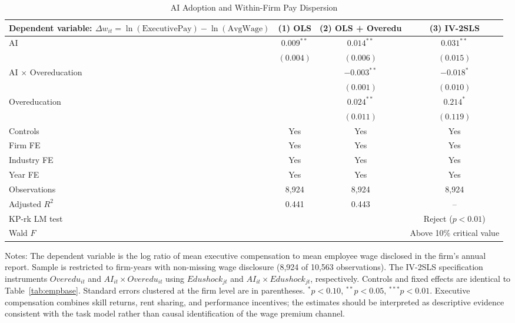 \documentclass[12pt,a4paper]{article}
\theoremstyle{predstyle}
\theoremstyle{plain}
\newcommand{\Overedu}{\mathit{Overedu}}
\begin{document}
\begin{table}[H]
\centering
\caption{AI Adoption and Within-Firm Pay Dispersion}
\label{tab:wageprem}
\begin{threeparttable}
\scriptsize
\setlength{\tabcolsep}{4pt}
\begin{tabular}{lccc}
\toprule
Dependent variable: \(\Delta w_{it} = \ln(\text{ExecutivePay}) - \ln(\text{AvgWage})\) & (1) OLS & (2) OLS + Overedu & (3) IV-2SLS \\
\midrule
AI & \(0.009^{**}\) & \(0.014^{**}\) & \(0.031^{**}\) \\
 & \((0.004)\) & \((0.006)\) & \((0.015)\) \\
AI \(\times\) Overeducation & & \(-0.003^{**}\) & \(-0.018^{*}\) \\
 & & \((0.001)\) & \((0.010)\) \\
Overeducation & & \(0.024^{**}\) & \(0.214^{*}\) \\
 & & \((0.011)\) & \((0.119)\) \\
Controls & Yes & Yes & Yes \\
Firm FE & Yes & Yes & Yes \\
Industry FE & Yes & Yes & Yes \\
Year FE & Yes & Yes & Yes \\
\midrule
Observations & 8,924 & 8,924 & 8,924 \\
Adjusted \(R^2\) & 0.441 & 0.443 & -- \\
KP-rk LM test & & & Reject (\(p<0.01\)) \\
Wald \(F\) & & & Above 10\% critical value \\
\bottomrule
\end{tabular}
\begin{tablenotes}
\footnotesize
\item Notes: The dependent variable is the log ratio of mean executive compensation to mean employee wage disclosed in the firm's annual report. Sample is restricted to firm-years with non-missing wage disclosure (8,924 of 10,563 observations). The IV-2SLS specification instruments \(\Overedu_{it}\) and \(AI_{it} \times \Overedu_{it}\) using \(Edushock_{jt}\) and \(AI_{it} \times Edushock_{jt}\), respectively. Controls and fixed effects are identical to Table~\ref{tab:empbase}. Standard errors clustered at the firm level are in parentheses. \(^{*}p<0.10\), \(^{**}p<0.05\), \(^{***}p<0.01\). Executive compensation combines skill returns, rent sharing, and performance incentives; the estimates should be interpreted as descriptive evidence consistent with the task model rather than causal identification of the wage premium channel.
\end{tablenotes}
\end{threeparttable}
\end{table}
\end{document}
